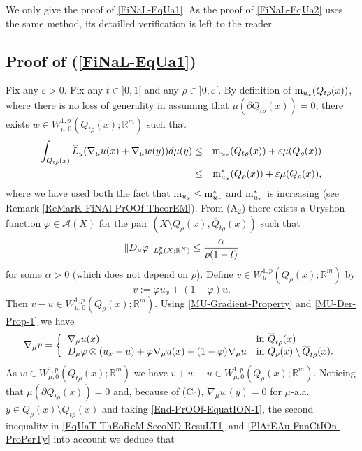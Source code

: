 \documentclass[10pt]{amsart}
\numberwithin{equation}{section}
\theoremstyle{definition}
\theoremstyle{remark}
\begin{document}
We only give the proof of \eqref{FiNaL-EqUa1}. As the proof of \eqref{FiNaL-EqUa2} uses the same method, its detailled verification is left to the reader.

\subsection*{Proof of (\ref{FiNaL-EqUa1})} Fix any ${\varepsilon}>0$. Fix any $t\in]0,1[$ and any $\rho\in]0,{\varepsilon}[$. By definition of ${\rm m}_{u_x}(Q_{t\rho}(x))$, where there is no loss of generality in assuming that $\mu(\partial Q_{t\rho}(x))=0$, there exists $w\in W^{1,p}_{\mu,0}(Q_{t\rho}(x);{{\mathbb R}}^m)$ such that
\begin{eqnarray}\label{End-PrOOf-EquatION-1}
\int_{Q_{t\rho}(x)}\widehat{L}_y(\nabla_\mu u(x)+\nabla_\mu w(y))d\mu(y)
&\leq& {\rm m}_{u_x}(Q_{t\rho}(x))+{\varepsilon}\mu(Q_{\rho}(x))\label{FiNalPrOOf-EqN1}\\
&\leq&{\rm m}^*_{u_x}(Q_\rho(x))+{\varepsilon}\mu(Q_\rho(x)),\nonumber
\end{eqnarray}
where we have used both the fact that ${\rm m}_{u_x}\leq {\rm m}^*_{u_x}$ and ${\rm m}^*_{u_x}$ is increasing (see Remark \ref{ReMarK-FiNAl-PrOOf-TheorEM}). From (A$_2$) there exists a Uryshon function $\varphi\in\mathcal{A}(X)$ for the pair $(X\setminus Q_{\rho}(x),\overline{Q}_{t\rho}(x))$ such that 
\begin{equation}\label{PlAtEAu-FunCtIOn-ProPerTy}
\|D_\mu\varphi\|_{L^p_\mu(X;{{\mathbb R}}^N)}\leq {\alpha\over\rho(1-t)}
\end{equation} 
for some $\alpha>0$ (which does not depend on $\rho$). Define $v\in W^{1,p}_{\mu}(Q_\rho(x);{{\mathbb R}}^m)$ by
$$
v:=\varphi u_x+(1-\varphi)u.
$$
Then $v-u\in W^{1,p}_{\mu,0}(Q_\rho(x);{{\mathbb R}}^m)$. Using \eqref{MU-Gradient-Property} and \eqref{MU-Der-Prop-1} we have
$$
\nabla_\mu v=\left\{
\begin{array}{ll}
\nabla_{\mu}u(x)&\hbox{in }\overline{Q}_{t\rho}(x)\\
D_\mu\varphi\otimes(u_x-u)+\varphi\nabla_\mu u(x)+(1-\varphi)\nabla_\mu u&\hbox{in }Q_\rho(x)\setminus \overline{Q}_{t\rho}(x).
\end{array}
\right.
$$
As $w\in W^{1,p}_{\mu,0}(Q_{t\rho}(x);{{\mathbb R}}^m)$ we have $v+w-u\in W^{1,p}_{\mu,0}(Q_\rho(x);{{\mathbb R}}^m)$. Noticing that $\mu(\partial Q_{t\rho}(x))=0$ and, because of (C$_0$), $\nabla_\mu w(y)=0$ for $\mu$-a.a. $y\in Q_\rho(x)\setminus \overline{Q}_{t\rho}(x)$ and taking \eqref{End-PrOOf-EquatION-1}, the second inequality in \eqref{EqUaT-ThEoReM-SecoND-ResuLT1} and \eqref{PlAtEAu-FunCtIOn-ProPerTy} into account we deduce that
\end{document}
